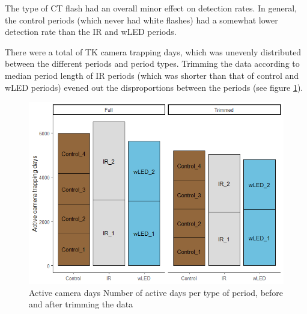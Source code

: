 


The type of CT flash had an overall minor effect on detection rates.
In general, the control periods (which never had white flashes) had a somewhat lower detection rate than the IR and wLED periods.

There were a total of TK camera trapping days, which was unevenly distributed between the different periods and period types. Trimming the data according to median period length of IR periods (which was shorter than that of control and wLED periods) evened out the disproportions between the periods (see figure \ref{fig:active days}).

\begin{figure}
 \centering
	\includegraphics[scale=.9]{../R/glmm_sp_files/figure-html/active-days-3.png}
 \caption[Active camera days]
 {Active camera days %
 Number of active days per type of period, before and after trimming the data}
 \label{fig:active days}
\end{figure}




